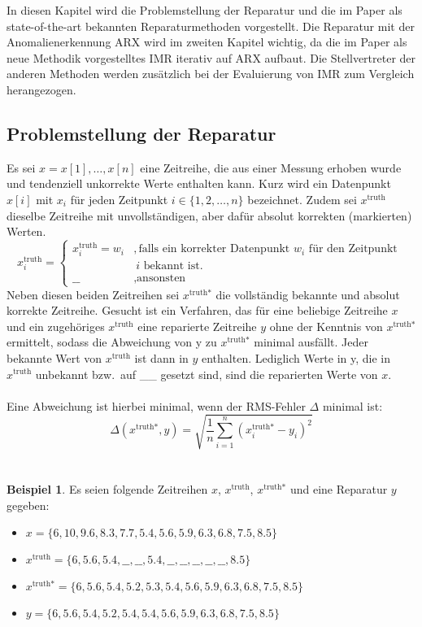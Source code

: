 In diesen Kapitel wird die Problemstellung der Reparatur und die im Paper als
state-of-the-art bekannten Reparaturmethoden vorgestellt.  Die Reparatur mit
der Anomalienerkennung ARX wird im zweiten Kapitel wichtig, da die im Paper als
neue Methodik vorgestelltes IMR iterativ auf ARX aufbaut.  Die Stellvertreter
der anderen Methoden werden zusätzlich bei der Evaluierung von IMR zum
Vergleich herangezogen.

\subsection{Problemstellung der Reparatur}

Es sei $x = x[1],\dots,x[n]$ eine Zeitreihe, die aus einer Messung erhoben
wurde und tendenziell unkorrekte Werte enthalten kann. Kurz wird ein
Datenpunkt $x[i]$ mit $x_i$ für jeden Zeitpunkt $i \in
\{1,2,\dots,n\}$ bezeichnet. Zudem sei $x^{\text{truth}}$ dieselbe Zeitreihe
mit unvollständigen, aber dafür absolut korrekten (markierten) Werten.
\[
    x^{\text{truth}}_i = \left\{
\begin{array}{ll}
    x^{\text{truth}}_i = w_i&, \text{falls ein korrekter Datenpunkt }w_i
    \text{ für den Zeitpunkt }\\
&~ i \text{ bekannt ist.}\\
    \text{\_\_}&, \text{ansonsten}
\end{array}
 \right.
\]
Neben diesen beiden Zeitreihen sei $x^{\text{truth*}}$ die vollständig bekannte
und absolut korrekte Zeitreihe. Gesucht ist ein Verfahren, das für eine beliebige
Zeitreihe $x$ und ein zugehöriges $x^{\text{truth}}$ eine reparierte Zeitreihe
$y$ ohne der Kenntnis von $x^{\text{truth*}}$ ermittelt, sodass die Abweichung von y
zu $x^{\text{truth*}}$ minimal ausfällt. Jeder bekannte Wert von
$x^{\text{truth}}$ ist dann in $y$ enthalten. Lediglich Werte in y, die in
$x^{\text{truth}}$ unbekannt bzw.\ auf \_\_ gesetzt sind, sind die reparierten
Werte von $x$.
\\
\\
Eine Abweichung ist hierbei minimal, wenn der RMS-Fehler $\Delta$ minimal ist:
\[
    \Delta\left(x^{\text{truth*}}, y\right) = \sqrt{\frac{1}{n} \sum_{i=1}^n \left( x^{\text{truth*}}_i - y_i \right)^2}
\]
~\\
\\
\textbf{Beispiel 1}. Es seien folgende Zeitreihen $x$, $x^{\text{truth}}$, $x^{\text{truth*}}$ und eine Reparatur $y$ gegeben:
\begin{itemize}
    \item $x =                 \{6, 10, 9.6, 8.3, 7.7, 5.4, 5.6, 5.9, 6.3, 6.8, 7.5, 8.5\}$
    \item $x^{\text{truth}} =  \{6, 5.6, 5.4,  \_\_, \_\_,5.4, \_\_,\_\_,\_\_,\_\_,\_\_,8.5\}$
    \item $x^{\text{truth*}} =  \{6, 5.6, 5.4,  5.2, 5.3, 5.4, 5.6, 5.9, 6.3, 6.8, 7.5, 8.5\}$
    \item $y =  \{6, 5.6, 5.4,  5.2, 5.4, 5.4, 5.6, 5.9, 6.3, 6.8, 7.5, 8.5\}$
\end{itemize}
